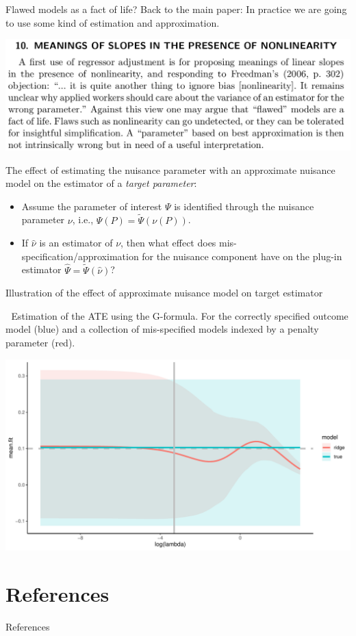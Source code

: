 \documentclass[smaller]{beamer}\usepackage{listings}
\begin{document}
\begin{frame}[label={sec:org9a133b2}]{Flawed models as a fact of life?}
Back to the main paper: In practice we are going to use some kind of estimation and approximation.
\begin{center}
\includegraphics[width=.9\linewidth]{./quotes/sect10-model-approx.png}
\end{center}

The effect of estimating the nuisance parameter with an approximate nuisance model on the estimator
of a \emph{target parameter}:
\begin{itemize}
\item Assume the parameter of interest \(\Psi\) is identified through the nuisance parameter \(\nu\), i.e.,
\(\Psi(P) = \tilde\Psi(\nu(P))\).
\item If \(\hat \nu\) is an estimator of \(\nu\), then what effect does mis-specification/approximation for
the nuisance component have on the plug-in estimator \(\hat \Psi = \tilde\Psi(\hat \nu)\)?
\end{itemize}
\end{frame}

\begin{frame}[label={sec:orgc174f03}]{\normalsize Illustration of the effect of approximate nuisance model on target estimator}
\begin{block}{$\;$}
\small Estimation of the ATE using the G-formula. For the correctly specified outcome model (blue)
and a collection of mis-specified models indexed by a penalty parameter (red).

\begin{center}
\includegraphics[width=.9\linewidth]{./fig-approximate-nuisance.pdf}
\end{center}
\end{block}
\end{frame}

\section{References}
\label{sec:orge086179}

\begin{frame}[label={sec:orgd62378c}]{References}
\small 
\end{frame}
\end{document}
